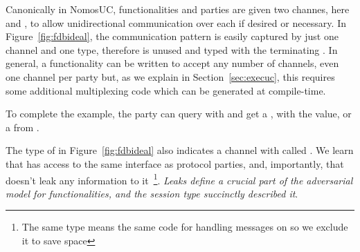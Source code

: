 Canonically in NomosUC, functionalities and parties are given two channes, here  and , to allow unidirectional communication over each if desired or necessary. 
In Figure~\ref{fig:fdbideal}, the communication pattern is easily captured by just one channel and one type, therefore  is unused and typed with the terminating . 
In general, a functionality can be written to accept any number of channels, even one channel per party but, as we explain in Section~\ref{sec:execuc}, this requires some additional multiplexing code which can be generated at compile-time.

To complete the example, the party can query with  and get a , with the value, or a  from \Fdb.

The type of \Fdb in Figure~\ref{fig:fdbideal} also indicates a channel with \A called . 
We learn that \A has access to the same interface as protocol parties, and, importantly, that \Fdb doesn't leak any information to it~\footnote{The same type means the same code for handling messages on  so we exclude it to save space}.
\emph{Leaks define a crucial part of the adversarial model for functionalities, and the session type succinctly described it}.



